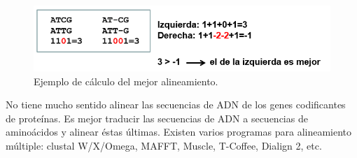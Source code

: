 \begin{figure}[htbp]
\centering
\includegraphics[width=0.5\linewidth]{figs/mejor-alineamiento.png}
\caption{Ejemplo de cálculo del mejor alineamiento.}
\end{figure}

No tiene mucho sentido alinear las secuencias de ADN de los genes codificantes de proteínas. Es mejor traducir las secuencias de ADN a secuencias de aminoácidos y alinear éstas últimas. Existen varios programas para alineamiento múltiple: clustal W/X/Omega, MAFFT, Muscle, T-Coffee, Dialign 2, etc. 



